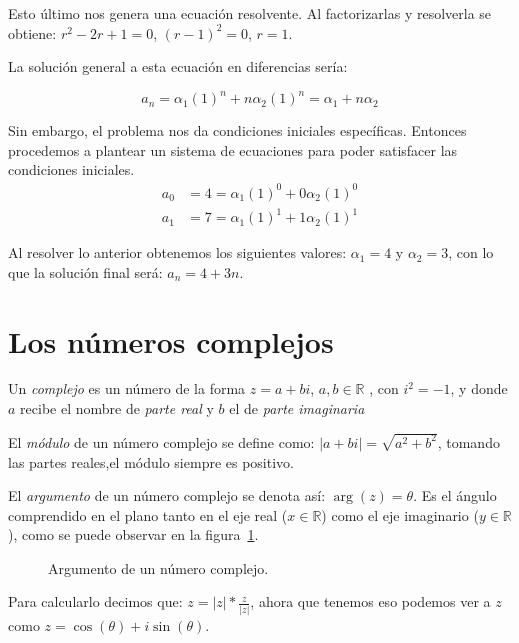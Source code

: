 \documentclass{report}
\begin{document}
Esto último nos genera una ecuación resolvente. Al factorizarlas y
resolverla se obtiene: $r^2-2r+1=0$, $(r-1)^2=0$, ${r=1}$.

La solución general a esta ecuación en diferencias sería:



$$a_{n}=\alpha_{1}(1)^n+n\alpha_{2}(1)^n=\alpha_{1}+n\alpha_{2}$$

Sin embargo, el problema nos da condiciones iniciales
específicas. Entonces procedemos a plantear un sistema de ecuaciones
para poder satisfacer las condiciones iniciales.
\begin{align*}
  a_{0}&=4=\alpha_{1}(1)^0+0\alpha_{2}(1)^0\\
  a_{1}&=7=\alpha_{1}(1)^1+1\alpha_{2}(1)^1
\end{align*}

Al resolver lo anterior obtenemos los siguientes valores:
$\alpha_{1}=4$ y $\alpha_{2}=3$, con lo que la solución final será:
$a_{n}=4+3n$.


\section{Los números  complejos}

Un \textit{complejo} es un número de la forma $z=a+bi$, $a,b\in\mathbb{R}$ ,
con $i^2=-1$, y donde $a$ recibe el nombre de \textit{parte real} y $b$ el de
\textit{parte imaginaria}

El \textit{módulo} de un número complejo se define como:
$|a+bi|=\sqrt{a^2+b^2}$, tomando las partes reales,el módulo
siempre es positivo.

El \textit{argumento} de un número complejo se denota así: $\arg(z)=\theta$. Es
el ángulo comprendido en el plano tanto en el eje real
($x\in\mathbb{R}$) como el eje imaginario ($y\in\mathbb{R}$), como se puede observar en la figura~\ref{argumento}.
\begin{figure}[htp]
\centering
{}
\caption{Argumento de un número complejo.}
\label{argumento}
\end{figure}

Para calcularlo decimos que:
$z=|z|*\frac{z}{|z|}$, ahora que tenemos eso podemos ver a $z$ como
$z=\cos(\theta)+i\sin(\theta)$.
\end{document}
